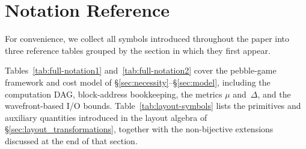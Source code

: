 \section{Notation Reference}\label{app:notation}

For convenience, we collect all symbols introduced throughout the paper
into three reference tables grouped by the section in which they first
appear.

Tables~\ref{tab:full-notation1} and~\ref{tab:full-notation2} cover the
pebble-game framework and cost model of
\S\ref{sec:necessity}--\S\ref{sec:model}, including the computation DAG,
block-address bookkeeping, the metrics $\mu$ and~$\Delta$, and the
wavefront-based I/O bounds.
%
Table~\ref{tab:layout-symbols} lists the primitives and auxiliary
quantities introduced in the layout algebra of
\S\ref{sec:layout_transformations}, together with the non-bijective
extensions discussed at the end of that section.

